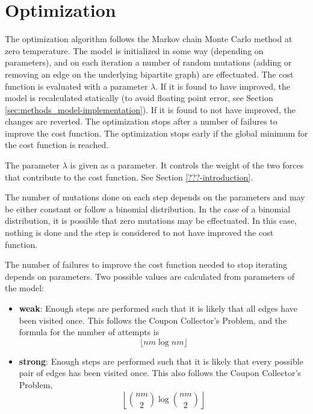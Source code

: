 \section{Optimization}
\label{sec:methods_optimization}

The optimization algorithm follows the Markov chain Monte Carlo method at zero temperature.
The model is initialized in some way (depending on parameters), and on each iteration a number of random mutations (adding or removing an edge on the underlying bipartite graph) are effectuated.
The cost function is evaluated with a parameter $\lambda$.
If it is found to have improved, the model is recalculated statically (to avoid floating point error, see Section \ref{sec:methods_model-implementation}).
If it is found to not have improved, the changes are reverted.
The optimization stops after a number of failures to improve the cost function.
The optimization stops early if the global minimum for the cost function is reached.

The parameter $\lambda$ is given as a parameter.
It controls the weight of the two forces that contribute to the cost function.
See Section \ref{???-introduction}.

The number of mutations done on each step depends on the parameters and may be either constant or follow a binomial distribution.
In the case of a binomial distribution, it is possible that zero mutations may be effectuated.
In this case, nothing is done and the step is considered to not have improved the cost function.

The number of failures to improve the cost function needed to stop iterating depends on parameters.
Two possible values are calculated from parameters of the model:
\begin{itemize}
\item \textbf{weak}:
  Enough steps are performed such that it is likely that all edges have been visited once.
  This follows the Coupon Collector's Problem, and the formula for the number of attempts is
  \begin{equation*}
    \lfloor nm \log nm \rfloor
  \end{equation*}
\item \textbf{strong}:
  Enough steps are performed such that it is likely that every possible pair of edges has been visited once.
  This also follows the Coupon Collector's Problem,
  \begin{equation*}
    \left\lfloor {nm \choose 2} \log {nm \choose 2} \right\rfloor
  \end{equation*}
\end{itemize}

